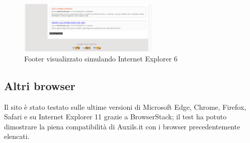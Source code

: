 \begin{figure}[H]
  \centering \includegraphics[width=0.6\textwidth]{images/homeie62.png}
  \caption{Footer visualizzato simulando Internet Explorer 6}
\end{figure}
\subsection{Altri browser}
Il sito è stato testato sulle ultime versioni di Microsoft Edge, Chrome, Firefox, Safari e su Internet Explorer 11 grazie a BrowserStack; il test ha potuto dimostrare la piena compatibilità di Auxils.it con i browser precedentemente elencati.